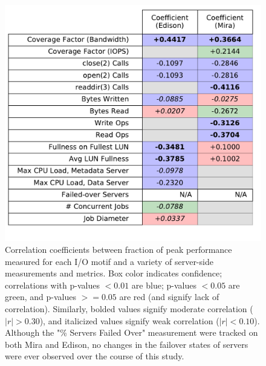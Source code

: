 \documentclass[conference,10pt,compsocconf]{IEEEtran}
\begin{document}
\begin{figure}[t]
    \centering
    \includegraphics[width=\columnwidth]{figs/correlation_table.pdf}
    \caption{Correlation coefficients between fraction of peak performance measured for each I/O motif and a variety of server-side measurements and metrics.  Box color indicates confidence; correlations with p-values $< 0.01$ are blue; p-values $< 0.05$ are green, and p-values $>= 0.05$ are red (and signify lack of correlation).  Similarly, bolded values signify moderate correlation ($|r| > 0.30$), and italicized values signify weak correlation ($|r| < 0.10$).  Although the "\% Servers Failed Over" measurement were tracked on both Mira and Edison, no changes in the
    failover states of servers were ever observed over the course of this study.
    }
    \label{fig:correlation-table}
\end{figure}
\end{document}
